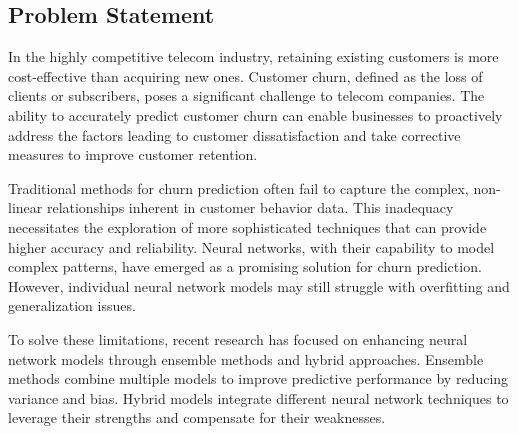 {%

}

\subsection{Problem Statement} {
In the highly competitive telecom industry, retaining existing customers is more cost-effective than acquiring new ones. Customer churn, defined as the loss of clients or subscribers, poses a significant challenge to telecom companies. The ability to accurately predict customer churn can enable businesses to proactively address the factors leading to customer dissatisfaction and take corrective measures to improve customer retention\cite{Agarwal2022-cq}.

Traditional methods for churn prediction often fail to capture the complex, non-linear relationships inherent in customer behavior data\cite{Ahmad2019}. This inadequacy necessitates the exploration of more sophisticated techniques that can provide higher accuracy and reliability. Neural networks, with their capability to model complex patterns, have emerged as a promising solution for churn prediction\cite{Agrawal2018}. However, individual neural network models may still struggle with overfitting and generalization issues\cite{8667113}.

To solve these limitations, recent research has focused on enhancing neural network models through ensemble methods and hybrid approaches\cite{8667113}. Ensemble methods combine multiple models to improve predictive performance by reducing variance and bias. Hybrid models integrate different neural network techniques to leverage their strengths and compensate for their weaknesses\cite{TSAI200912547}.

}

